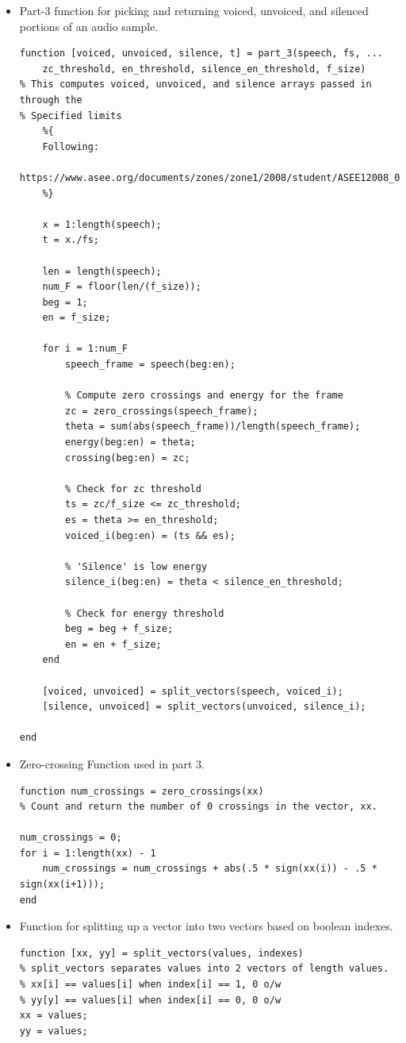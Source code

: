 \documentclass[11pt]{article}
\begin{document}
\begin{itemize}

\item Part-3 function for picking and returning voiced, unvoiced, and silenced portions of an audio sample.

\begin{lstlisting}
function [voiced, unvoiced, silence, t] = part_3(speech, fs, ...
    zc_threshold, en_threshold, silence_en_threshold, f_size)
% This computes voiced, unvoiced, and silence arrays passed in through the
% Specified limits
    %{
    Following:
    https://www.asee.org/documents/zones/zone1/2008/student/ASEE12008_0044_paper.pdf
    %}

    x = 1:length(speech);
    t = x./fs;

    len = length(speech);
    num_F = floor(len/(f_size));
    beg = 1;
    en = f_size;

    for i = 1:num_F
        speech_frame = speech(beg:en);

        % Compute zero crossings and energy for the frame
        zc = zero_crossings(speech_frame);
        theta = sum(abs(speech_frame))/length(speech_frame);
        energy(beg:en) = theta;
        crossing(beg:en) = zc;

        % Check for zc threshold
        ts = zc/f_size <= zc_threshold;
        es = theta >= en_threshold;
        voiced_i(beg:en) = (ts && es);

        % 'Silence' is low energy
        silence_i(beg:en) = theta < silence_en_threshold;

        % Check for energy threshold
        beg = beg + f_size;
        en = en + f_size;
    end

    [voiced, unvoiced] = split_vectors(speech, voiced_i); 
    [silence, unvoiced] = split_vectors(unvoiced, silence_i);

end
\end{lstlisting}


\item Zero-crossing Function used in part 3.
\begin{lstlisting}
function num_crossings = zero_crossings(xx)
% Count and return the number of 0 crossings in the vector, xx.

num_crossings = 0;
for i = 1:length(xx) - 1
    num_crossings = num_crossings + abs(.5 * sign(xx(i)) - .5 * sign(xx(i+1)));
end
\end{lstlisting}

\item Function for splitting up a vector into two vectors based on boolean indexes.
\begin{lstlisting}
function [xx, yy] = split_vectors(values, indexes)
% split_vectors separates values into 2 vectors of length values.
% xx[i] == values[i] when index[i] == 1, 0 o/w
% yy[y] == values[i] when index[i] == 0, 0 o/w
xx = values;
yy = values;


\end{lstlisting}
\end{itemize}
\end{document}
